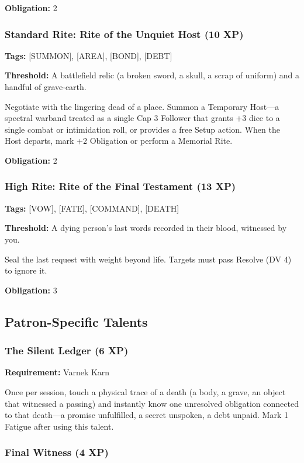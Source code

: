 \textbf{Obligation:} 2

\subsubsection{Standard Rite: Rite of the Unquiet Host (10 XP)}

\textbf{Tags:} [SUMMON], [AREA], [BOND], [DEBT]

\textbf{Threshold:} A battlefield relic (a broken sword, a skull, a scrap of uniform) and a handful of grave-earth.

Negotiate with the lingering dead of a place. Summon a Temporary Host—a spectral warband treated as a single Cap 3 Follower that grants +3 dice to a single combat or intimidation roll, or provides a free Setup action. When the Host departs, mark +2 Obligation or perform a Memorial Rite.

\textbf{Obligation:} 2

\subsubsection{High Rite: Rite of the Final Testament (13 XP)}

\textbf{Tags:} [VOW], [FATE], [COMMAND], [DEATH]

\textbf{Threshold:} A dying person's last words recorded in their blood, witnessed by you.

Seal the last request with weight beyond life. Targets must pass Resolve (DV 4) to ignore it.

\textbf{Obligation:} 3

\subsection{Patron-Specific Talents}

\subsubsection{The Silent Ledger (6 XP)}

\textbf{Requirement:} Varnek Karn

Once per session, touch a physical trace of a death (a body, a grave, an object that witnessed a passing) and instantly know one unresolved obligation connected to that death—a promise unfulfilled, a secret unspoken, a debt unpaid. Mark 1 Fatigue after using this talent.

\subsubsection{Final Witness (4 XP)}

